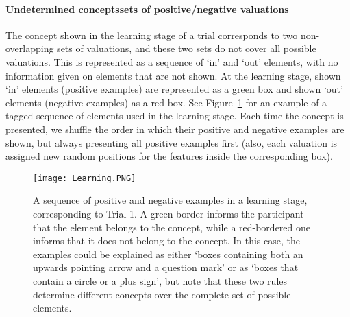 \paragraph{Undetermined concepts\textemdash sets of positive/negative valuations}\label{IncompleteConcepts} The concept shown in the learning stage of a trial corresponds to two non-overlapping sets of valuations, and these two sets do not cover all possible valuations. This is represented as a sequence of `in' and `out' elements, with no information given on elements that are not shown. %
At the learning stage, shown `in' elements (positive examples) are represented as a green box and shown `out' elements (negative examples) as a red box. See Figure~\ref{Figure:training} for an example of a tagged sequence of elements used in the learning stage. Each time the concept is presented, we shuffle the order in which their positive and negative examples are shown, but always presenting all positive examples first (also, each valuation is assigned new random positions for the features inside the corresponding box). 

%

\begin{figure}[h!] 
\begin{center}
    	\texttt{[image: Learning.PNG]}
	\caption{A sequence of positive and negative examples in a learning stage, corresponding to Trial 1.  A green border informs the participant that the element belongs to the concept, while a red-bordered one informs that it does not belong to the concept. In this case, the examples could be explained as either `boxes containing both an upwards pointing arrow and a question mark' or as `boxes that contain a circle or a plus sign', but note that these two rules determine different concepts over the complete set of possible elements.}
	\label{Figure:training} %
\end{center}
\end{figure}

